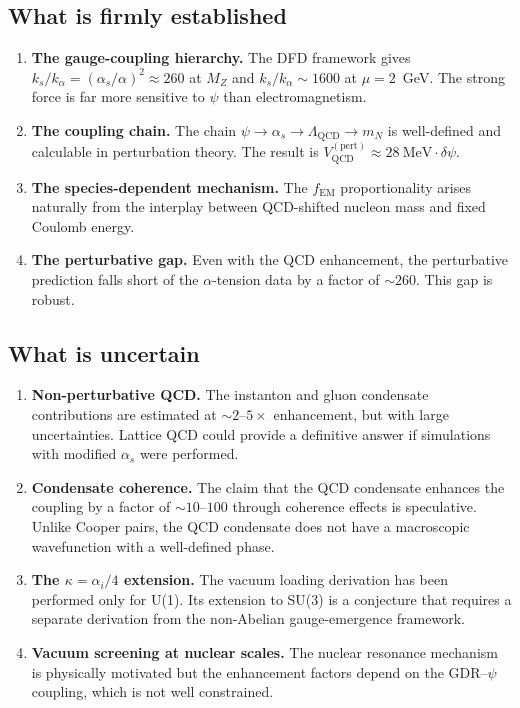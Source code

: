 \documentclass[aps,prd,twocolumn,superscriptaddress,floatfix,nofootinbib]{revtex4-2}
\newcommand{\kap}{\kappa}
\newcommand{\LQCD}{\Lambda_{\mathrm{QCD}}}
\newcommand{\as}{\alpha_s}
\newcommand{\fEM}{f_{\mathrm{EM}}}
\newcommand{\mN}{m_N}
\newcommand{\ka}{k_\alpha}
\newcommand{\ks}{k_s}
\newcommand{\dpsi}{\delta\psi}
\newcommand{\alphafine}{\alpha}
\begin{document}
\subsection{What is firmly established}

\begin{enumerate}
\item \textbf{The gauge-coupling hierarchy.} The DFD framework gives
$\ks/\ka = (\as/\alphafine)^2 \approx 260$ at $M_Z$ and
$\ks/\ka \sim 1600$ at $\mu = 2$~GeV. The strong force is far more
sensitive to $\psi$ than electromagnetism.

\item \textbf{The coupling chain.} The chain
$\psi \to \as \to \LQCD \to \mN$ is well-defined and calculable in
perturbation theory. The result is $V_{\mathrm{QCD}}^{(\mathrm{pert})}
\approx 28~\text{MeV} \cdot \dpsi$.

\item \textbf{The species-dependent mechanism.} The $\fEM$ proportionality
arises naturally from the interplay between QCD-shifted nucleon mass and
fixed Coulomb energy.

\item \textbf{The perturbative gap.} Even with the QCD enhancement, the
perturbative prediction falls short of the $\alpha$-tension data by a factor
of $\sim 260$. This gap is robust.
\end{enumerate}

\subsection{What is uncertain}

\begin{enumerate}
\item \textbf{Non-perturbative QCD.} The instanton and gluon condensate
contributions are estimated at $\sim 2$--$5\times$ enhancement, but with
large uncertainties. Lattice QCD could provide a definitive answer if
simulations with modified $\as$ were performed.

\item \textbf{Condensate coherence.} The claim that the QCD condensate
enhances the coupling by a factor of $\sim 10$--$100$ through coherence
effects is speculative. Unlike Cooper pairs, the QCD condensate does not
have a macroscopic wavefunction with a well-defined phase.

\item \textbf{The $\kap = \alpha_i/4$ extension.} The vacuum loading
derivation has been performed only for U(1). Its extension to SU(3) is a
conjecture that requires a separate derivation from the non-Abelian
gauge-emergence framework.

\item \textbf{Vacuum screening at nuclear scales.} The nuclear resonance
mechanism is physically motivated but the enhancement factors depend on
the GDR--$\psi$ coupling, which is not well constrained.
\end{enumerate}
\end{document}
